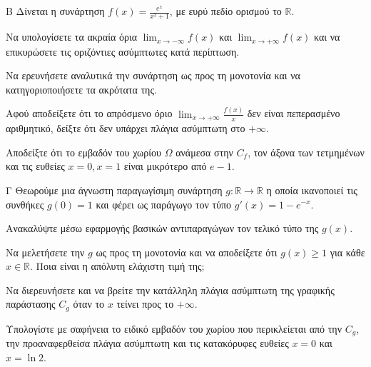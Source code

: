 \begin{thema}{Β}
Δίνεται η συνάρτηση $f(x) = \frac{e^x}{x^2+1}$, με ευρύ πεδίο ορισμού το $\mathbb{R}$.
\begin{erwthma}
    \item Να υπολογίσετε τα ακραία όρια $\displaystyle\lim_{x\to-\infty} f(x)$ και $\displaystyle\lim_{x\to+\infty} f(x)$ και να επικυρώσετε τις οριζόντιες ασύμπτωτες κατά περίπτωση. 
    \item Να ερευνήσετε αναλυτικά την συνάρτηση ως προς τη μονοτονία και να κατηγοριοποιήσετε τα ακρότατα της. 
    \item Αφού αποδείξετε ότι το απρόσμενο όριο $\displaystyle\lim_{x\to+\infty} \frac{f(x)}{x}$ δεν είναι πεπερασμένο αριθμητικό, δείξτε ότι δεν υπάρχει πλάγια ασύμπτωτη στο $+\infty$. 
    \item Αποδείξτε ότι το εμβαδόν του χωρίου $\Omega$ ανάμεσα στην $C_f$, τον άξονα των τετμημένων και τις ευθείες $x=0, x=1$ είναι μικρότερο από $e-1$. 
\end{erwthma}
\end{thema}

\begin{thema}{Γ}
Θεωρούμε μια άγνωστη παραγωγίσιμη συνάρτηση $g: \mathbb{R} \to \mathbb{R}$ η οποία ικανοποιεί τις συνθήκες $g(0) = 1$ και φέρει ως παράγωγο τον τύπο $g'(x) = 1 - e^{-x}$. 
\begin{erwthma}
    \item Ανακαλύψτε μέσω εφαρμογής βασικών αντιπαραγώγων τον τελικό τύπο της $g(x)$. 
    \item Να μελετήσετε την $g$ ως προς τη μονοτονία και να αποδείξετε ότι $g(x) \ge 1$ για κάθε $x \in \mathbb{R}$. Ποια είναι η απόλυτη ελάχιστη τιμή της; 
    \item Να διερευνήσετε και να βρείτε την κατάλληλη πλάγια ασύμπτωτη της γραφικής παράστασης $C_g$ όταν το $x$ τείνει προς το $+\infty$. 
    \item Υπολογίστε με σαφήνεια το ειδικό εμβαδόν του χωρίου που περικλείεται από την $C_g$, την προαναφερθείσα πλάγια ασύμπτωτη και τις κατακόρυφες ευθείες $x=0$ και $x=\ln 2$. 
\end{erwthma}
\end{thema}

